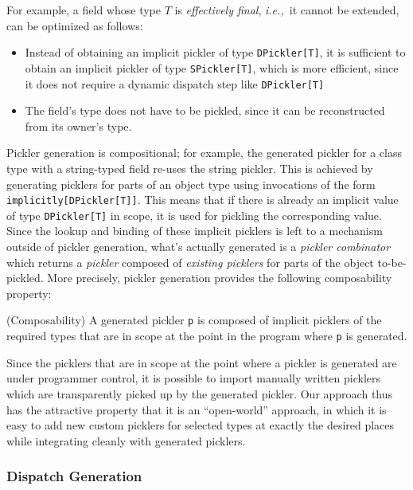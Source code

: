 \documentclass[10pt]{sigplanconf}
\theoremstyle{definition}
\theoremstyle{definition}
\newcommand{\ie}{{\em i.e.,~}}
\newcommand{\term}[1]{\mbox{\texttt{#1}}}
\begin{document}
For example, a field whose type $T$ is {\em effectively final}, \ie it cannot
be extended, can be optimized as follows:

\begin{itemize}
\item Instead of obtaining an implicit pickler of type \term{DPickler[T]}, it is
sufficient to obtain an implicit pickler of type \term{SPickler[T]}, which is
more efficient, since it does not require a dynamic dispatch step like
\term{DPickler[T]}

\item The field's type does not have to be pickled, since it can be reconstructed
from its owner's type.
\end{itemize}

Pickler generation is compositional; for example, the generated pickler for a
class type with a string-typed field re-uses the string pickler. This is
achieved by generating picklers for parts of an object type using invocations
of the form \verb|implicitly[DPickler[T]]|. This means that if there is
already an implicit value of type \term{DPickler[T]} in scope, it is used for
pickling the corresponding value. Since the lookup and binding of these
implicit picklers is left to a mechanism outside of pickler generation, what's
actually generated is a {\em pickler combinator} which returns a {\em pickler}
composed of {\em existing picklers} for parts of the object to-be-pickled.
More precisely, pickler generation provides the following composability
property:

\begin{prop}{(Composability)}
A generated pickler \term{p} is composed of implicit picklers of the required
types that are in scope at the point in the program where \term{p} is
generated.
\end{prop}

Since the picklers that are in scope at the point where a pickler is generated
are under programmer control, it is possible to import manually written
picklers which are transparently picked up by the generated pickler. Our
approach thus has the attractive property that it is an ``open-world''
approach, in which it is easy to add new custom picklers for selected types at
exactly the desired places while integrating cleanly with generated picklers.

\subsubsection{Dispatch Generation}
\end{document}
